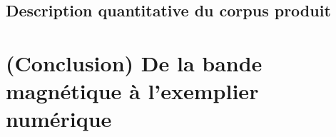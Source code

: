 
\subsection{Description quantitative du corpus produit}


\section*{(Conclusion) De la bande magnétique à l'exemplier numérique}

